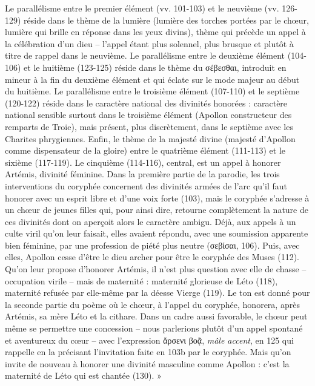 \documentclass[12pt]{book}%
\newcommand{\italique}[1]{\textit{#1}}%
\newenvironment{groupe}{%
\pstart%
\ledgroup%
}{%
\pend %
}%
\begin{document}
\begin{pages}
\begin{Leftside}
\begin{groupe}
{{Le parallélisme entre le premier élément (vv. 101-103) et le neuvième (vv. 126-129) réside dans le thème de la lumière (lumière des torches portées par le chœur, lumière qui brille en réponse dans les yeux divins), thème qui précède un appel à la célébration d'un dieu – l'appel étant plus solennel, plus brusque et plutôt à titre de rappel dans le neuvième. Le parallélisme entre le deuxième élément (104-106) et le huitième (123-125) réside dans le thème du σέβεσθαι, introduit en mineur à la fin du deuxième élément et qui éclate sur le mode majeur au début du huitième.
Le parallélisme entre le troisième élément (107-110) et le septième (120-122) réside dans le caractère national des divinités honorées : caractère national sensible surtout dans le troisième élément (Apollon constructeur des remparts de Troie), mais présent, plus discrètement, dans le septième avec les Charites phrygiennes.
Enfin, le thème de la majesté divine (majesté d'Apollon comme dispensateur de la gloire) entre le quatrième élément (111-113) et le sixième (117-119). Le cinquième (114-116), central, est un appel à honorer Artémis, divinité féminine. Dans la première partie de la parodie, les trois interventions du coryphée concernent des divinités armées de l'arc qu'il faut honorer avec un esprit libre et d'une voix forte (103), mais le coryphée s'adresse à un chœur de jeunes filles qui, pour ainsi dire, retourne complètement la nature de ces divinités dont on aperçoit alors le caractère ambigu. Déjà, aux appels à un culte viril qu'on leur faisait, elles avaient répondu, avec une soumission apparente bien féminine, par une profession de piété plus neutre (σεβίσαι, 106). Puis, avec elles, Apollon cesse d'être le dieu archer pour être le coryphée des Muses (112). Qu'on leur propose d'honorer Artémis, il n'est plus question avec elle de chasse – occupation virile – mais de maternité : maternité glorieuse de Léto (118), maternité refusée par elle-même par la déesse Vierge (119). Le ton est donné pour la seconde partie du poème où le chœur, à l'appel du coryphée, honorera, après Artémis, sa mère Léto et la cithare. Dans un cadre aussi favorable, le chœur peut même se permettre une concession – nous parlerions plutôt d'un appel spontané et aventureux du cœur – avec l'expression ἄρσενι βοᾷ, \italique{mâle accent}, en 125 qui rappelle en la précisant l'invitation faite en 103b par le coryphée. Mais qu'on invite de nouveau à honorer une divinité masculine comme Apollon : c'est la maternité de Léto qui est chantée (130). »\\
}}
\end{groupe}
\end{Leftside}
\end{pages}
\end{document}
